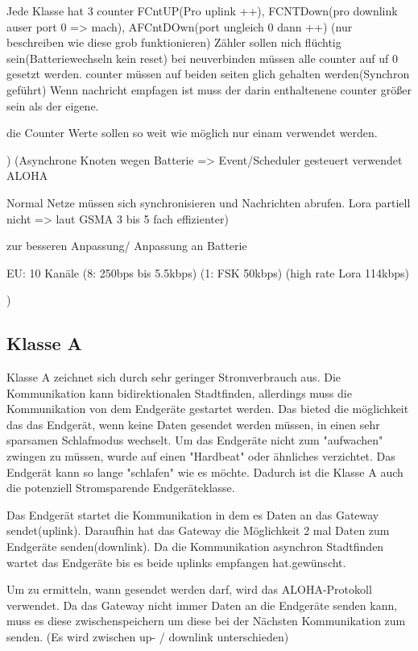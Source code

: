 \documentclass[a4paper,12pt]{article}
\begin{document}
        Jede Klasse hat 3 counter FCntUP(Pro uplink ++), FCNTDown(pro downlink auser port 0 => mach), AFCntDOwn(port ungleich 0 dann ++)   (nur beschreiben wie diese grob funktionieren) Zähler sollen nich flüchtig sein(Batteriewechseln kein reset)
        bei neuverbinden müssen alle counter auf uf 0 gesetzt werden. counter müssen auf beiden seiten glich gehalten werden(Synchron geführt)
        Wenn nachricht empfagen ist muss der darin enthaltenene counter größer sein als der eigene. 

        die Counter Werte sollen so weit wie möglich nur einam verwendet werden.
        
        )
        \cite{LoraClasses}
        \cite{WhatIsLoRa}(Asynchrone Knoten wegen Batterie => Event/Scheduler gesteuert verwendet ALOHA
        
        Normal Netze müssen sich synchronisieren und Nachrichten abrufen. Lora partiell nicht => laut GSMA 3 bis 5 fach effizienter)
    
        zur besseren Anpassung/ Anpassung an Batterie
        
        EU: 10 Kanäle (8: 250bps bis 5.5kbps) (1: FSK 50kbps) (high rate Lora 114kbps)

        )
        \subsection{Klasse A}\label{sec:ClassA}
            Klasse A zeichnet sich durch sehr geringer Stromverbrauch aus. Die Kommunikation kann bidirektionalen Stadtfinden, allerdings muss die Kommunikation von dem Endgeräte gestartet werden. Das bieted die möglichkeit das das Endgerät, wenn keine Daten gesendet werden müssen, in einen sehr
            sparsamen Schlafmodus wechselt. Um das Endgeräte nicht zum "aufwachen" zwingen zu müssen, wurde auf einen "Hardbeat" oder ähnliches verzichtet. Das Endgerät kann so lange "schlafen" wie es möchte. Dadurch ist die Klasse A auch die potenziell Stromsparende Endgeräteklasse.
            
            Das Endgerät startet die Kommunikation in dem es Daten an das Gateway sendet(uplink). Daraufhin hat das Gateway die Möglichkeit 2 mal Daten zum Endgeräte senden(downlink). Da die Kommunikation asynchron Stadtfinden wartet das Endgeräte bis es beide uplinks empfangen hat.gewünscht.
            
            Um zu ermitteln, wann gesendet werden darf, wird das ALOHA-Protokoll verwendet.
            Da das Gateway nicht immer Daten an die Endgeräte senden kann, muss es diese zwischenspeichern um diese bei der Nächsten Kommunikation zum senden.
            \cite{LoRaSpec}(Es wird zwischen up- / downlink unterschieden)
\end{document}
